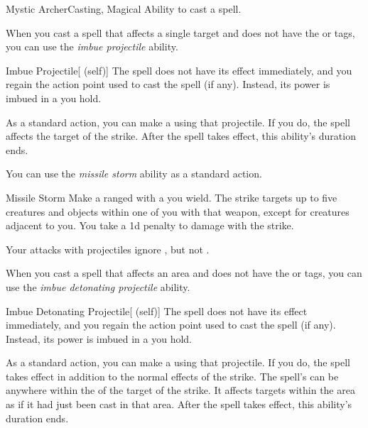     \begin{feat}{Mystic Archer}{Casting, Magical}
        \featpre Ability to cast a spell.

         When you cast a spell that affects a single target and does not have the  or  tags,
            you can use the \textit{imbue projectile} ability.
        \begin{attuneability}{Imbue Projectile}[ (self)]
            The spell does not have its effect immediately, and you regain the action point used to cast the spell (if any).
            Instead, its power is imbued in a  you hold.

            As a standard action, you can make a  using that projectile.
            If you do, the spell affects the target of the strike.
            After the spell takes effect, this ability's duration ends.
        \end{attuneability}

         You can use the \textit{missile storm} ability as a standard action.
        \begin{apability}{Missile Storm}
            Make a ranged  with a  you wield.
            The strike targets up to five creatures and objects within one  of you with that weapon, except for creatures adjacent to you.
            You take a \minus1d penalty to damage with the strike.
        \end{apability}

         Your attacks with projectiles ignore , but not .

         When you cast a spell that affects an area and does not have the  or  tags,
            you can use the \textit{imbue detonating projectile} ability.
        \begin{attuneability}{Imbue Detonating Projectile}[ (self)]
            The spell does not have its effect immediately, and you regain the action point used to cast the spell (if any).
            Instead, its power is imbued in a  you hold.

            As a standard action, you can make a  using that projectile.
            If you do, the spell takes effect in addition to the normal effects of the strike.
            The spell's  can be anywhere within the  of the target of the strike.
            It affects targets within the area as if it had just been cast in that area.
            After the spell takes effect, this ability's duration ends.
        \end{attuneability}


\end{feat}
